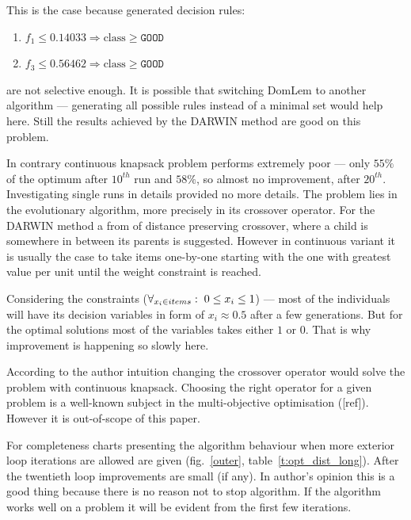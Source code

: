 This is the case because generated decision rules:
\begin{enumerate}
\item $f_1 \le 0.14033 \Rightarrow \text{class} \ge \texttt{GOOD}$
\item $f_3 \le 0.56462 \Rightarrow \text{class} \ge \texttt{GOOD}$
\end{enumerate}
are not selective enough. It is possible that switching DomLem to another
algorithm --- generating all possible rules instead of a minimal set would
help here. Still the results achieved by the DARWIN method are good on this
problem.

In contrary continuous knapsack problem performs extremely poor --- only
$55\%$ of the optimum after $10^{th}$ run and $58\%$, so almost no
improvement, after $20^{th}$. Investigating single runs in details provided no
more details. The problem lies in the evolutionary algorithm, more precisely
in its crossover operator. For the DARWIN method a from of distance preserving
crossover, where a child is somewhere in between its parents is
suggested. However in continuous variant it is usually the case to take items
one-by-one starting with the one with greatest value per unit until the weight
constraint is reached.

Considering the constraints ($ \forall_{x_i \in items}: \hspace{0.1cm} 0 \leq
x_i \leq 1 $) --- most of the individuals will have its decision variables in
form of $x_i \approx 0.5$ after a few generations. But for the optimal
solutions most of the variables takes either $1$ or $0$. That is why
improvement is happening so slowly here.

According to the author intuition changing the crossover operator would solve
the problem with continuous knapsack. Choosing the right operator for a given
problem is a well-known subject in the multi-objective optimisation
([ref]). However it is out-of-scope of this paper.

For completeness charts presenting the algorithm behaviour when more exterior
loop iterations are allowed are given (fig.~\ref{outer},
table~\ref{t:opt_dist_long}). After the twentieth loop improvements are small
(if any). In author's opinion this is a good thing because there is no reason
not to stop algorithm. If the algorithm works well on a problem it will be
evident from the first few iterations.

